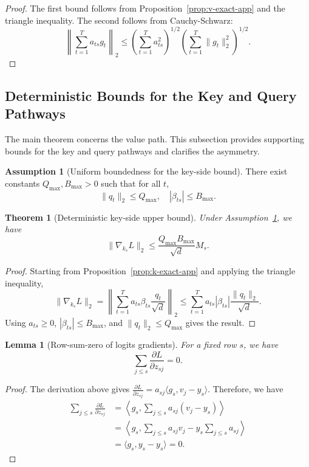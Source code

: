 \documentclass{article}
\theoremstyle{plain}
\newtheorem{theorem}{Theorem}
\newtheorem{lemma}{Lemma}
\theoremstyle{definition}
\newtheorem{assumption}{Assumption}
\theoremstyle{remark}
\begin{document}
\begin{proof}
The first bound follows from Proposition~\ref{prop:v-exact-app} and the triangle inequality. The second follows from Cauchy-Schwarz:
\[
    \left\|\sum_{t=1}^T a_{ts} g_t\right\|_2
    \le \left(\sum_{t=1}^T a_{ts}^2\right)^{1/2} \left(\sum_{t=1}^T \|g_t\|_2^2\right)^{1/2}.
\]
\end{proof}


\subsection{Deterministic Bounds for the Key and Query Pathways}\label{app:theory:kq}
The main theorem concerns the value path. This subsection provides supporting bounds for the key and query pathways and clarifies the asymmetry.

\begin{assumption}[Uniform boundedness for the key-side bound]\label{assump:k-bounded-app}
There exist constants $Q_{\max}, B_{\max} > 0$ such that for all $t$,
\[
    \|q_t\|_2 \le Q_{\max},
    \quad
    |\beta_{ts}| \le B_{\max}.
\]
\end{assumption}

\begin{theorem}[Deterministic key-side upper bound]\label{thm:k-bound-app}
Under Assumption~\ref{assump:k-bounded-app}, we have
\[
    \|\nabla_{k_s}L\|_2 \le \frac{Q_{\max} B_{\max}}{\sqrt{d}} M_s.
\]
\end{theorem}

\begin{proof}
Starting from Proposition~\ref{prop:k-exact-app} and applying the triangle inequality,
\[
    \|\nabla_{k_s}L\|_2
    = \left\|\sum_{t=1}^T a_{ts}\beta_{ts} \frac{q_t}{\sqrt{d}}\right\|_2
    \le \sum_{t=1}^T a_{ts}|\beta_{ts}|\frac{\|q_t\|_2}{\sqrt{d}}.
\]
Using $a_{ts}\ge 0$, $|\beta_{ts}|\le B_{\max}$, and $\|q_t\|_2\le Q_{\max}$ gives the result.
\end{proof}

\begin{lemma}[Row-sum-zero of logits gradients]\label{lem:row-sum-zero-app}
For a fixed row $s$, we have
\[
    \sum_{j \le s} \frac{\partial L}{\partial z_{sj}} = 0.
\]
\end{lemma}

\begin{proof}
The derivation above gives $\frac{\partial L}{\partial z_{sj}} = a_{sj}\langle g_s, v_j - y_s\rangle$. Therefore, we have
\[\begin{aligned}
    \sum_{j \le s} \frac{\partial L}{\partial z_{sj}}
    &= \left\langle g_s, \sum_{j \le s} a_{sj}(v_j - y_s) \right\rangle \\
    &= \left\langle g_s, \sum_{j \le s} a_{sj}v_j - y_s \sum_{j \le s} a_{sj} \right\rangle \\
    &= \langle g_s, y_s - y_s \rangle = 0.
\end{aligned}\]
\end{proof}
\end{document}
